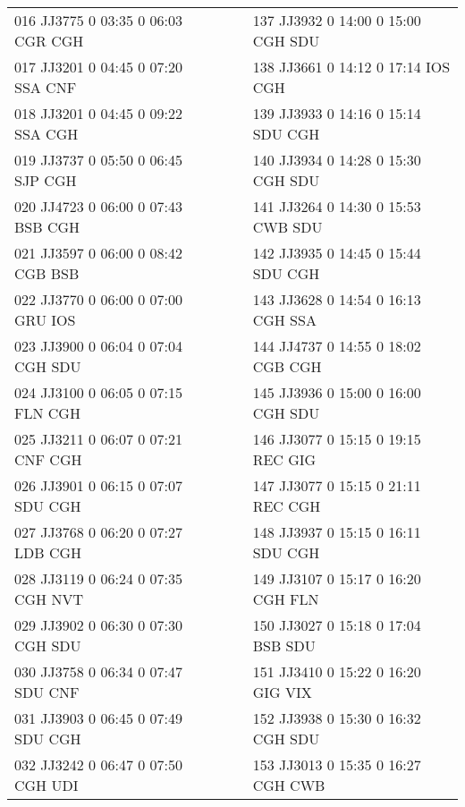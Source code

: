 \begin{scriptsize}
\begin{longtable}{l c c l}
016 JJ3775 0 03:35 0 06:03 CGR CGH & & & 137 JJ3932 0 14:00 0 15:00 CGH SDU \\

017 JJ3201 0 04:45 0 07:20 SSA CNF & & & 138 JJ3661 0 14:12 0 17:14 IOS CGH \\

018 JJ3201 0 04:45 0 09:22 SSA CGH & & & 139 JJ3933 0 14:16 0 15:14 SDU CGH \\

019 JJ3737 0 05:50 0 06:45 SJP CGH & & & 140 JJ3934 0 14:28 0 15:30 CGH SDU \\

020 JJ4723 0 06:00 0 07:43 BSB CGH & & & 141 JJ3264 0 14:30 0 15:53 CWB SDU \\

021 JJ3597 0 06:00 0 08:42 CGB BSB & & & 142 JJ3935 0 14:45 0 15:44 SDU CGH \\

022 JJ3770 0 06:00 0 07:00 GRU IOS & & & 143 JJ3628 0 14:54 0 16:13 CGH SSA \\

023 JJ3900 0 06:04 0 07:04 CGH SDU & & & 144 JJ4737 0 14:55 0 18:02 CGB CGH \\

024 JJ3100 0 06:05 0 07:15 FLN CGH & & & 145 JJ3936 0 15:00 0 16:00 CGH SDU \\

025 JJ3211 0 06:07 0 07:21 CNF CGH & & & 146 JJ3077 0 15:15 0 19:15 REC GIG \\

026 JJ3901 0 06:15 0 07:07 SDU CGH & & & 147 JJ3077 0 15:15 0 21:11 REC CGH \\

027 JJ3768 0 06:20 0 07:27 LDB CGH & & & 148 JJ3937 0 15:15 0 16:11 SDU CGH \\

028 JJ3119 0 06:24 0 07:35 CGH NVT & & & 149 JJ3107 0 15:17 0 16:20 CGH FLN \\

029 JJ3902 0 06:30 0 07:30 CGH SDU & & & 150 JJ3027 0 15:18 0 17:04 BSB SDU \\

030 JJ3758 0 06:34 0 07:47 SDU CNF & & & 151 JJ3410 0 15:22 0 16:20 GIG VIX \\

031 JJ3903 0 06:45 0 07:49 SDU CGH & & & 152 JJ3938 0 15:30 0 16:32 CGH SDU \\

032 JJ3242 0 06:47 0 07:50 CGH UDI & & & 153 JJ3013 0 15:35 0 16:27 CGH CWB \\


\end{longtable}
\end{scriptsize}

